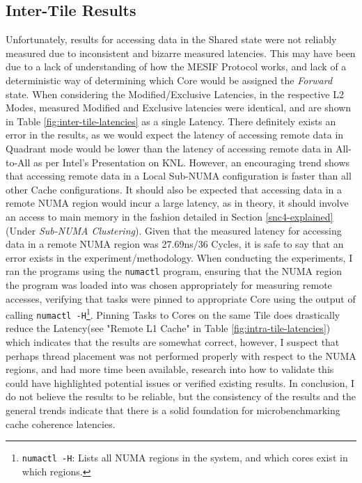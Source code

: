 \documentclass[bsc,frontabs,twoside,singlespacing,parskip,deptreport]{infthesis}     %
\begin{document}
\subsection{Inter-Tile Results}
Unfortunately, results for accessing data in the Shared state were not reliably measured due to inconsistent and bizarre measured latencies. This may have been due to a lack of understanding of how the MESIF Protocol works, and lack of a deterministic way of determining which Core would be assigned the \emph{Forward} state. When considering the Modified/Exclusive Latencies, in the respective L2 Modes, measured Modified and Exclusive latencies were identical, and are shown in Table \ref{fig:inter-tile-latencies} as a single Latency. There definitely exists an error in the results, as we would expect the latency of accessing remote data in Quadrant mode would be lower than the latency of accessing remote data in All-to-All as per Intel's Presentation on KNL\cite{intel_pres}. However, an encouraging trend shows that accessing remote data in a Local Sub-NUMA configuration is faster than all other Cache configurations. It should also be expected that accessing data in a remote NUMA region would incur a large latency, as in theory, it should involve an access to main memory in the fashion detailed in Section \ref{snc4-explained}(Under \textit{Sub-NUMA Clustering}). Given that the measured latency for accessing data in a remote NUMA region was 27.69ns/36 Cycles, it is safe to say that an error exists in the experiment/methodology. When conducting the experiments, I ran the programs using the \texttt{numactl} program, ensuring that the NUMA region the program was loaded into was chosen appropriately for measuring remote accesses, verifying that tasks were pinned to appropriate Core using the output of calling \texttt{numactl -H}\footnote{\texttt{numactl -H}: Lists all NUMA regions in the system, and which cores exist in which regions.}. Pinning Tasks to Cores on the same Tile does drastically reduce the Latency(see "Remote L1 Cache" in Table \ref{fig:intra-tile-latencies}) which indicates that the results are somewhat correct, however, I suspect that perhaps thread placement was not performed properly with respect to the NUMA regions, and had more time been available, research into how to validate this could have highlighted potential issues or verified existing results. In conclusion, I do not believe the results to be reliable, but the consistency of the results and the general trends indicate that there is a solid foundation for microbenchmarking cache coherence latencies.
\end{document}
